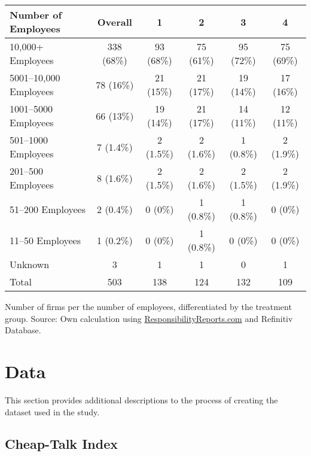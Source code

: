 \documentclass[12pt]{article}
\begin{document}
\begin{table}
    \begin{tabular}{lccccc}
        \toprule
        Number of Employees & Overall & 1 & 2 & 3 & 4\\
        \midrule
        10,000+ Employees & 338 (68\%) & 93 (68\%) & 75 (61\%) & 95 (72\%) & 75 (69\%)\\
        5001--10,000 Employees & 78 (16\%) & 21 (15\%) & 21 (17\%) & 19 (14\%) & 17 (16\%)\\
        1001--5000 Employees & 66 (13\%) & 19 (14\%) & 21 (17\%) & 14 (11\%) & 12 (11\%)\\
        501--1000 Employees & 7 (1.4\%) & 2 (1.5\%) & 2 (1.6\%) & 1 (0.8\%) & 2 (1.9\%)\\
        201--500 Employees & 8 (1.6\%) & 2 (1.5\%) & 2 (1.6\%) & 2 (1.5\%) & 2 (1.9\%)\\
        51--200 Employees & 2 (0.4\%) & 0 (0\%) & 1 (0.8\%) & 1 (0.8\%) & 0 (0\%)\\
        11--50 Employees & 1 (0.2\%) & 0 (0\%) & 1 (0.8\%) & 0 (0\%) & 0 (0\%)\\
        Unknown & 3 & 1 & 1 & 0 & 1\\
        \midrule
        Total & 503 & 138 & 124 & 132  & 109\\
        \bottomrule
    \end{tabular}


    \vspace{0.2cm}

    \begin{tablenotes}
        \footnotesize
        \item Number of firms per the number of employees, differentiated by the treatment group. Source: Own calculation using \href{https://responsibilityreports.com}{ResponsibilityReports.com} and Refinitiv Database.
    \end{tablenotes}
\end{table}


\newpage

\normalsize
\raggedright{}
\setcounter{table}{0}
\setcounter{figure}{0}


\section{Data}\label{app:data}

This section provides additional descriptions to the process of creating the dataset used in the study.

\subsection{Cheap-Talk Index}\label{app:data:cti}
\end{document}
